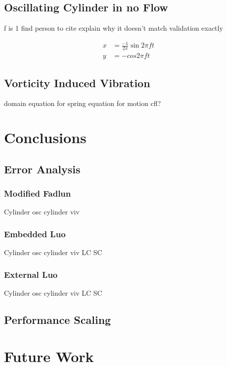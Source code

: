 \documentclass[onehalf,11pt]{beavtex}
\begin{document}
\section{Oscillating Cylinder in no Flow}
\label{sec:Oscillating Cylinder in no Flow}
f is 1
find person to cite
explain why it doesn't match validation exactly

\begin{align}
x&=\frac{-1}{2\pi}\sin{2\pi ft}\label{eq:cylinder position2}\\
y&=-cos{2\pi ft}\;\label{eq:cylinder velocity2}
\end{align}

\section{Vorticity Induced Vibration}
domain
equation for spring
equation for motion
cfl?

\chapter{Conclusions}
\section{Error Analysis}


\subsection{Modified Fadlun}
Cylinder
osc cylinder
viv
\subsection{Embedded Luo}
Cylinder
osc cylinder
viv
	LC
	SC
\subsection{External Luo}
Cylinder
osc cylinder
viv
	LC
	SC

\section{Performance Scaling}

\chapter{Future Work}



\end{document}
